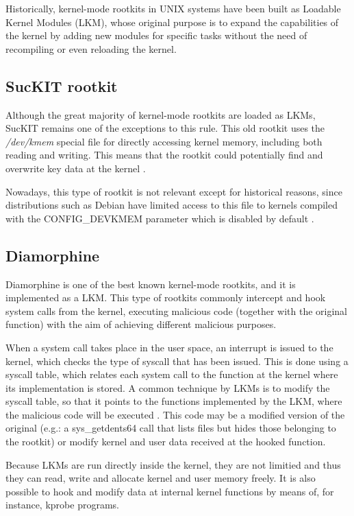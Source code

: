 Historically, kernel-mode rootkits in UNIX systems have been built as
Loadable Kernel Modules (LKM), whose original purpose is to expand the
capabilities of the kernel by adding new modules for specific tasks without
the need of recompiling or even reloading the kernel. 

\subsection{SucKIT rootkit}
Although the great majority of kernel-mode rootkits are loaded as LKMs,
SucKIT \cite{suckit_rootkit} remains one of the exceptions to this rule.
This old rootkit uses the \textit{/dev/kmem} special file \cite{dev_kmem}
for directly accessing kernel memory, including both reading and writing.
This means that the rootkit could potentially find and overwrite key data
at the kernel \cite{suckit_lasamhna}.

Nowadays, this type of rootkit is not relevant except for historical
reasons, since distributions such as Debian have limited access to this file to
kernels compiled with the CONFIG\_DEVKMEM parameter \cite{dev_kmem_debian}
which is disabled by default \cite{dev_kmem_off_default}.

\subsection{Diamorphine}
Diamorphine \cite{diamorphine_github} is one of the best known kernel-mode
rootkits, and it is implemented as a LKM. This type of rootkits commonly
intercept and hook system calls from the kernel, executing malicious code
(together with the original function) with the aim of achieving different
malicious purposes.

When a system call takes place in the user space, an interrupt is issued to
the kernel, which checks the type of syscall that has been issued. This is
done using a syscall table, which relates each system call to the function
at the kernel where its implementation is stored. A common technique by
LKMs is to modify the syscall table, so that it points to the functions
implemented by the LKM, where the malicious code will be executed
\cite{incibe_rootkit_lkm}. This code may be a modified version of the
original (e.g.: a sys\_getdents64 call that lists files but hides those
belonging to the rootkit) or modify kernel and user data received at the
hooked function.

Because LKMs are run directly inside the kernel, they are not limitied and thus
they can read, write and allocate kernel and user memory freely. It is also
possible to hook and modify data at internal kernel functions by means of,
for instance, kprobe programs.

